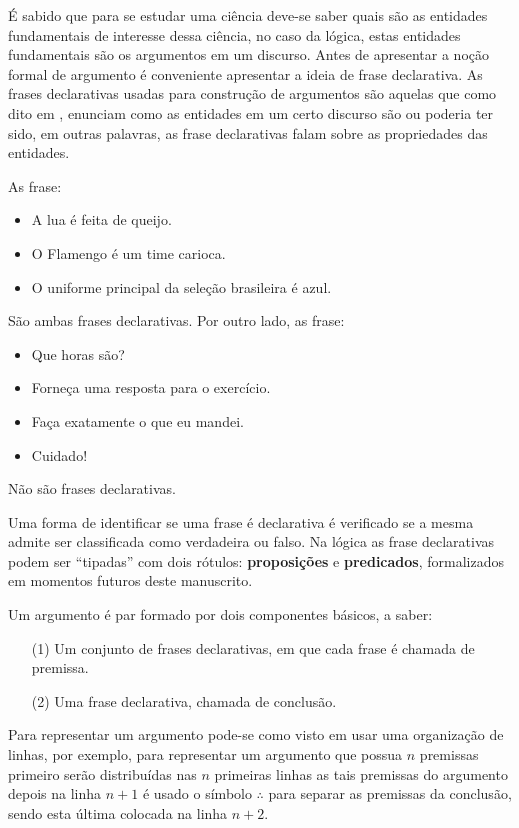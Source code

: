 É sabido que para se estudar uma ciência deve-se saber quais são as entidades fundamentais de interesse dessa ciência, no caso da lógica, estas entidades fundamentais são os argumentos em um discurso. Antes de apresentar a noção formal de argumento é conveniente apresentar a ideia de frase declarativa. As frases declarativas usadas para construção de argumentos são aquelas que como dito em \cite{joaoPavao2014}, enunciam como as entidades em um certo discurso são ou poderia ter sido, em outras palavras, as frase declarativas falam sobre as propriedades das entidades.

\begin{example}\label{exe:FrasesDeclarativas}
    As frase:
	\begin{itemize}
		\item A lua é feita de queijo.
		\item O Flamengo é um time carioca.
		\item O uniforme principal da seleção brasileira é azul.
	\end{itemize}
	São ambas frases declarativas. Por outro lado, as frase:
	\begin{itemize}
		\item Que horas são?
		\item Forneça uma resposta para o exercício.
		\item Faça exatamente o que eu mandei.
		\item Cuidado!
	\end{itemize}
	Não são frases declarativas.
\end{example}

Uma forma de identificar se uma frase é declarativa é verificado se a mesma admite ser classificada como verdadeira ou falso.  Na lógica as frase declarativas podem ser ``tipadas'' com dois rótulos: \textbf{proposições} e \textbf{predicados}, formalizados em momentos futuros deste manuscrito. 

\begin{definition}[Argumento]\label{def:Argumento}
	Um argumento é par formado por dois componentes básicos, a saber:
	\begin{itemize}
		\item[(1)] Um conjunto de frases declarativas, em que cada frase é chamada de premissa.
		\item[(2)] Uma frase declarativa, chamada de conclusão.
	\end{itemize}
\end{definition}

Para representar um argumento pode-se como visto em \cite{copi1981, joaoPavao2014} usar uma organização de linhas, por exemplo, para representar um argumento que possua $n$ premissas primeiro serão distribuídas nas $n$ primeiras linhas as tais premissas do argumento depois na linha $n+1$ é usado o símbolo $\therefore$ para separar as premissas da conclusão, sendo esta última colocada na linha $n+2$.

